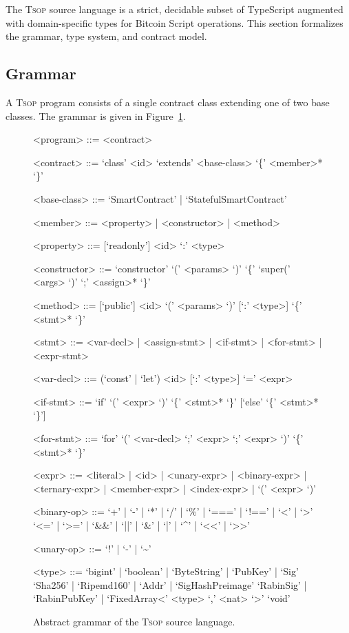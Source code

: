 \documentclass[11pt,a4paper]{article}
\newcommand{\tsop}{\textsc{Tsop}}
\begin{document}
The \tsop{} source language is a strict, decidable subset of TypeScript
augmented with domain-specific types for Bitcoin Script operations. This
section formalizes the grammar, type system, and contract model.

\subsection{Grammar}
\label{sec:grammar}

A \tsop{} program consists of a single contract class extending one of two
base classes. The grammar is given in Figure~\ref{fig:grammar}.

\begin{figure}[h]
\begin{grammar}
<program> ::= <contract>

<contract> ::= `class' <id> `extends' <base-class> `\{' <member>* `\}'

<base-class> ::= `SmartContract' | `StatefulSmartContract'

<member> ::= <property> | <constructor> | <method>

<property> ::= [`readonly'] <id> `:' <type>

<constructor> ::= `constructor' `(' <params> `)' `\{' `super(' <args> `)' `;' <assign>* `\}'

<method> ::= [`public'] <id> `(' <params> `)' [`:' <type>] `\{' <stmt>* `\}'

<stmt> ::= <var-decl> | <assign-stmt> | <if-stmt> | <for-stmt>
        | <expr-stmt>

<var-decl> ::= (`const' | `let') <id> [`:' <type>] `=' <expr>

<if-stmt> ::= `if' `(' <expr> `)' `\{' <stmt>* `\}' [`else' `\{' <stmt>* `\}']

<for-stmt> ::= `for' `(' <var-decl> `;' <expr> `;' <expr> `)' `\{' <stmt>* `\}'

<expr> ::= <literal> | <id> | <unary-expr> | <binary-expr> | <ternary-expr>
        | <member-expr> | <index-expr> | `(' <expr> `)'

<binary-op> ::= `+' | `-' | `*' | `/' | `\%' | `===' | `!==' | `<' | `>'
           \alt `<=' | `>=' | `\&\&' | `||' | `\&' | `|' | `\^{}' | `<<' | `>>'

<unary-op> ::= `!' | `-' | `\textasciitilde'

<type> ::= `bigint' | `boolean' | `ByteString' | `PubKey' | `Sig'
      \alt `Sha256' | `Ripemd160' | `Addr' | `SigHashPreimage'
      \alt `RabinSig' | `RabinPubKey' | `FixedArray<' <type> `,' <nat> `>'
      \alt `void'
\end{grammar}
\caption{Abstract grammar of the \tsop{} source language.}
\label{fig:grammar}
\end{figure}
\end{document}
